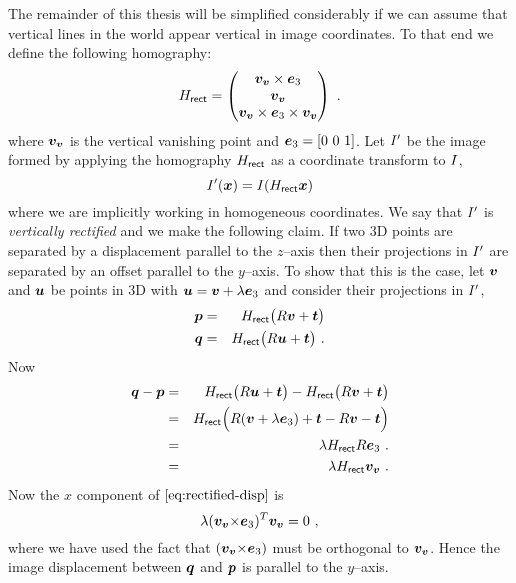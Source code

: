 The remainder of this thesis will be simplified considerably if we can
assume that vertical lines in the world appear vertical in image
coordinates. To that end we define the following homography:
\begin{equation}
  \label{eq:rectifier}
  \Rectifier =
  \begin{pmatrix}
    \vvpt \times \ez \\
    \vvpt \\
    \vvpt \times \ez \times \vvpt
  \end{pmatrix} ~.
\end{equation}
where $\vvpt$ is the vertical vanishing point and $\ez=[0~0~1]$.
Let $\Image'$ be the image formed by applying the homography $\Rectifier$ as a
coordinate transform to $\Image$,
\begin{equation}
  \label{eq:rectification}
  \Image'(\vect{x}) = \Image(\Rectifier \vect{x})
\end{equation}
where we are implicitly working in homogeneous coordinates. We say
that $\Image'$ is \textit{vertically rectified} and we make the
following claim. If two 3D points are separated by a displacement
parallel to the $z$--axis then their projections in $\Image'$ are
separated by an offset parallel to the $y$--axis. To show that this is
the case, let $\worldpt$ and $\otherworldpt$ be points in 3D with
$\otherworldpt = \worldpt + \lambda \ez$ and consider their
projections in $\Image'$,
\begin{eqnarray}
  \imagept &=& \Rectifier
    \bigl( \CamR \worldpt + \CamTr \bigr)\\
  \otherimagept &=& \Rectifier
    \bigl( \CamR \otherworldpt + \CamTr \bigr)~.
\end{eqnarray}
Now
\begin{eqnarray}
  \otherimagept - \imagept &=&
  \Rectifier
    \bigl( \CamR \otherworldpt + \CamTr \bigr) -
  \Rectifier
    \bigl( \CamR \worldpt + \CamTr \bigr)\\
  &=&
    \Rectifier \Bigl(
      \CamR (\worldpt+\lambda\ez) + \CamTr - \CamR\worldpt - \CamTr
    \Bigr)\\
  &=&
    \lambda \Rectifier \CamR \ez ~.\\
  &=&
    \label{eq:rectified-disp}
    \lambda \Rectifier \vvpt ~.
\end{eqnarray}
Now the $x$ component of $\eqnref{rectified-disp}$ is
\begin{equation}
  \lambda (\vvpt \cross \ez)^T \vvpt = 0 ~,
\end{equation}
where we have used the fact that $(\vvpt\cross\ez)$ must be orthogonal
to $\vvpt$. Hence the image displacement between $\otherimagept$ and
$\imagept$ is parallel to the $y$--axis.

